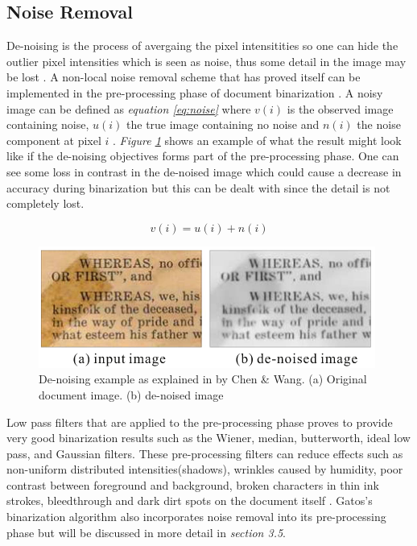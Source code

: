 \documentclass[11pt]{article}
\begin{document}
		\subsection{Noise Removal} %
			De-noising is the process of avergaing the pixel intensitities so one can hide the outlier pixel intensities which is seen as noise, thus some detail in the image may be lost \cite{buades2005non}. A non-local noise removal scheme that has proved itself can be implemented in the pre-processing phase of document binarization \cite{chen2017broken}. A noisy image can be defined as \textit{equation \ref{eq:noise}} where $v(i)$ is the observed image containing noise, $u(i)$ the true image containing no noise and $n(i)$ the noise component at pixel $i$ \cite{buades2005non}. \textit{Figure \ref{fig:denoise}} shows an example of what the result might look like if the de-noising objectives forms part of the pre-processing phase. One can see some loss in contrast in the de-noised image which could cause a decrease in accuracy during binarization but this can be dealt with since the detail is not completely lost.

		\begin{large}
		\begin{equation} \label{eq:noise}
		v(i) = u(i) + n(i)
		\end{equation}
		\end{large}

		\begin{figure}[!htb]
		 \centering
		 \includegraphics[scale=1]{denoise.png}
		 \caption{De-noising example as explained in \cite{chen2017broken} by Chen \& Wang. (a) Original document image. (b) de-noised image} %
		 \label{fig:denoise} %
		\end{figure}

			Low pass filters that are applied to the pre-processing phase proves to provide very good binarization results such as the Wiener, median, butterworth, ideal low pass, and Gaussian filters. These pre-processing filters can reduce effects such as non-uniform distributed intensities(shadows), wrinkles caused by humidity, poor contrast between foreground and background, broken characters in thin ink strokes, bleedthrough and dark dirt spots on the document itself \cite{ntogas2008binarization}. Gatos's binarization algorithm also incorporates noise removal into its pre-processing phase but will be discussed in more detail in \textit{section 3.5}. \\
\end{document}
